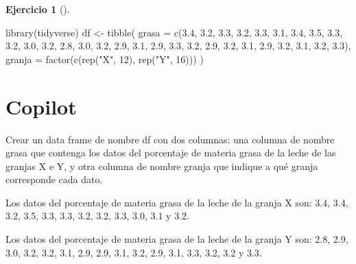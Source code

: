 \documentclass[
  a4paper,
]{scrreport}
\newenvironment{Shaded}{\begin{snugshade}}{\end{snugshade}}
\newcommand{\AttributeTok}[1]{\textcolor[rgb]{0.40,0.45,0.13}{#1}}
\newcommand{\DecValTok}[1]{\textcolor[rgb]{0.68,0.00,0.00}{#1}}
\newcommand{\ExtensionTok}[1]{\textcolor[rgb]{0.00,0.23,0.31}{#1}}
\newcommand{\FloatTok}[1]{\textcolor[rgb]{0.68,0.00,0.00}{#1}}
\newcommand{\FunctionTok}[1]{\textcolor[rgb]{0.28,0.35,0.67}{#1}}
\newcommand{\NormalTok}[1]{\textcolor[rgb]{0.00,0.23,0.31}{#1}}
\newcommand{\OtherTok}[1]{\textcolor[rgb]{0.00,0.23,0.31}{#1}}
\newcommand{\StringTok}[1]{\textcolor[rgb]{0.13,0.47,0.30}{#1}}
\theoremstyle{definition}
\newtheorem{exercise}{Ejercicio}[chapter]
\theoremstyle{remark}
\begin{document}
\begin{exercise}[]
\begin{enumerate}
\begin{tcolorbox}
\begin{Shaded}
\begin{Highlighting}[]
\FunctionTok{library}\NormalTok{(tidyverse)}
\NormalTok{df }\OtherTok{\textless{}{-}} \FunctionTok{tibble}\NormalTok{(}
    \AttributeTok{grasa =} \FunctionTok{c}\NormalTok{(}\FloatTok{3.4}\NormalTok{, }\FloatTok{3.2}\NormalTok{, }\FloatTok{3.3}\NormalTok{, }\FloatTok{3.2}\NormalTok{, }\FloatTok{3.3}\NormalTok{, }\FloatTok{3.1}\NormalTok{, }\FloatTok{3.4}\NormalTok{, }\FloatTok{3.5}\NormalTok{, }\FloatTok{3.3}\NormalTok{, }\FloatTok{3.2}\NormalTok{, }\FloatTok{3.0}\NormalTok{, }\FloatTok{3.2}\NormalTok{, }\FloatTok{2.8}\NormalTok{, }\FloatTok{3.0}\NormalTok{, }\FloatTok{3.2}\NormalTok{, }\FloatTok{2.9}\NormalTok{, }\FloatTok{3.1}\NormalTok{, }\FloatTok{2.9}\NormalTok{, }\FloatTok{3.3}\NormalTok{, }\FloatTok{3.2}\NormalTok{, }\FloatTok{2.9}\NormalTok{, }\FloatTok{3.2}\NormalTok{, }\FloatTok{3.1}\NormalTok{, }\FloatTok{2.9}\NormalTok{, }\FloatTok{3.2}\NormalTok{, }\FloatTok{3.1}\NormalTok{, }\FloatTok{3.2}\NormalTok{, }\FloatTok{3.3}\NormalTok{),}
    \AttributeTok{granja =} \FunctionTok{factor}\NormalTok{(}\FunctionTok{c}\NormalTok{(}\FunctionTok{rep}\NormalTok{(}\StringTok{"X"}\NormalTok{, }\DecValTok{12}\NormalTok{), }\FunctionTok{rep}\NormalTok{(}\StringTok{"Y"}\NormalTok{, }\DecValTok{16}\NormalTok{)))}
\NormalTok{)}
\end{Highlighting}
\end{Shaded}

  \section{Copilot}

\begin{Shaded}
\begin{Highlighting}[]
\ExtensionTok{Crear}\NormalTok{ un data frame de nombre df con dos columnas: una columna de nombre grasa que contenga los datos del porcentaje de materia grasa de la leche de las granjas X e Y, y otra columna de nombre granja que indique a qué granja corresponde cada dato. }

\ExtensionTok{Los}\NormalTok{ datos del porcentaje de materia grasa de la leche de la granja X son: 3.4, 3.4, 3.2, 3.5, 3.3, 3.3, 3.2, 3.2, 3.3, 3.0, 3.1 y 3.2.}

\ExtensionTok{Los}\NormalTok{ datos del porcentaje de materia grasa de la leche de la granja Y son: 2.8, 2.9, 3.0, 3.2, 3.2, 3.1, 2.9, 2.9, 3.1, 3.2, 2.9, 3.1, 3.3, 3.2, 3.2 y 3.3.}
\end{Highlighting}
\end{Shaded}


\end{tcolorbox}
\end{enumerate}
\end{exercise}
\end{document}
